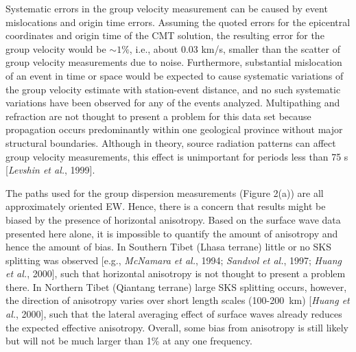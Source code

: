 \documentclass[12pt]{article}
\begin{document}
Systematic errors in the group velocity measurement can be caused by event mislocations and origin time 
errors.  Assuming the quoted errors for the epicentral coordinates and origin time of the CMT solution, the 
resulting error for the group velocity would be $\sim1\%$, i.e., about 0.03 km/s, smaller than the scatter 
of group velocity measurements due to noise.  Furthermore, substantial mislocation of an event in time or 
space would be expected to cause systematic variations of the group velocity estimate with station-event 
distance, and no such systematic variations have been observed for any of the events analyzed.  
Multipathing and refraction are not thought to present a problem for this data set because propagation 
occurs predominantly within one geological province without major structural boundaries. Although in 
theory, source radiation patterns can affect group velocity measurements, this effect is unimportant for 
periods less than 75 s [{\it Levshin et al.}, 1999]. 

The paths used for the group dispersion measurements (Figure 2(a)) are all
  approximately oriented EW. Hence, there is a concern that results might be
  biased by the presence of horizontal anisotropy.  Based on the surface wave
  data presented here alone, it is impossible to quantify the amount of
  anisotropy and hence the amount of bias.  In Southern Tibet (Lhasa terrane)
little or no  SKS splitting was observed [e.g., {\it McNamara et
    al.}, 1994; {\it Sandvol et    al.}, 1997; {\it Huang et    al.}, 2000],
  such that horizontal anisotropy is not thought to present a problem there.  In
  Northern Tibet (Qiantang terrane) large SKS splitting occurs, however, the direction of
  anisotropy varies over short length scales (100-200~km) [{\it Huang et
    al.}, 2000], such that the lateral averaging effect of surface waves already
  reduces the expected effective anisotropy.  Overall, some bias from anisotropy
  is still likely but will not be much larger than 1\% at any one frequency.
\end{document}
